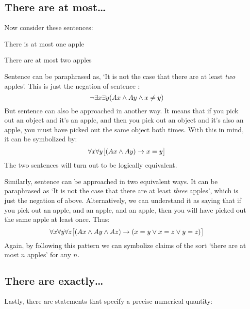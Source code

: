\subsection{There are at most\ldots}
Now consider these sentences:
\begin{earg}
	\item[\ex{atmost1}] There is at most one apple
	\item[\ex{atmost2}] There are at most two apples
\end{earg}
Sentence  can be paraphrased as, `It is not the case that there are at least \emph{two} apples'. This is just the negation of sentence :
$$\neg \exists x \exists y(Ax \wedge Ay \wedge  x \neq y)$$
But sentence  can also be approached in another way. It means that if you pick out an object and it's an apple, and then you pick out an object and it's also an apple, you must have picked out the same object both times. With this in mind, it can be symbolized by:
$$\forall x\forall y\bigl[(Ax \wedge Ay) \rightarrow x=y\bigr]$$
The two sentences will turn out to be logically equivalent.

Similarly, sentence  can be approached in two equivalent ways. It can be paraphrased as `It is not the case that there are at least \emph{three} apples', which is just the negation of  above.  Alternatively, we can understand it as saying that if you pick out an apple, and an apple, and an apple, then you will have picked out the same apple at least once. Thus:
$$\forall x\forall y\forall z\bigl[(Ax \wedge Ay \wedge Az) \rightarrow (x=y \vee x=z \vee y=z)\bigr]$$
Again, by following this pattern we can symbolize claims of the sort `there are at most $n$ apples' for any $n$.
\subsection{There are exactly\ldots}
Lastly, there are statements that specify a precise numerical quantity:

